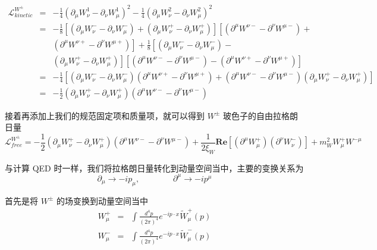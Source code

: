 \documentclass{article}
\begin{document}
\begin{eqnarray}
    \mathcal{L}_{kinetic}^{W^{\pm}} &=& -\frac{1}{4}\left(\partial_\mu W_\nu^1 - \partial_\nu W_\mu^1\right)^2 -\frac{1}{4}\left(\partial_\mu W_\nu^2 - \partial_\nu W_\mu^2\right)^2 \nonumber\\
    &=& -\frac{1}{8} \left[\left(\partial_\mu W_\nu^- - \partial_\nu W_\mu^-\right) + \left(\partial_\mu W_\nu^+ - \partial_\nu W_\mu^+\right)\right] \left[\left(\partial^\mu W^{\nu-} - \partial^\nu W^{\mu-}\right) + \right. \nonumber\\
    && \left.\left(\partial^\mu W^{\nu+} - \partial^\nu W^{\mu+}\right)\right] +\frac{1}{8} \left[\left(\partial_\mu W_\nu^- - \partial_\nu W_\mu^-\right) - \right. \nonumber\\
    && \left.\left(\partial_\mu W_\nu^+ - \partial_\nu W_\mu^+\right)\right] \left[\left(\partial^\mu W^{\nu-} - \partial^\nu W^{\mu-}\right) - \left(\partial^\mu W^{\nu+} - \partial^\nu W^{\mu+}\right)\right] \nonumber\\
    &=& -\frac{1}{4}\left[\left(\partial_\mu W_\nu^- - \partial_\nu W_\mu^-\right)\left(\partial^\mu W^{\nu+} - \partial^\nu W^{\mu+}\right) + \left(\partial^\mu W^{\nu-} - \partial^\nu W^{\mu-}\right)\left(\partial_\mu W_\nu^+ - \partial_\nu W_\mu^+\right)\right] \nonumber \\
    &=& -\frac{1}{2} \left(\partial_\mu W_\nu^+ - \partial_\nu W_\mu^+\right)\left(\partial^\mu W^{\nu-} - \partial^\nu W^{\mu-}\right) \nonumber
\end{eqnarray}

接着再添加上我们的规范固定项和质量项，就可以得到 $W^{\pm}$ 玻色子的自由拉格朗日量
\begin{equation}
    \mathcal{L}_{free}^{W^{\pm}} = -\frac{1}{2} \left(\partial_\mu W_\nu^+ - \partial_\nu W_\mu^+\right)\left(\partial^\mu W^{\nu-} - \partial^\nu W^{\mu-}\right) + \frac{1}{2\xi_W} \mathbf{Re}\left[\left(\partial^\mu W_\mu^{+}\right)\left(\partial^\nu W_{\nu}^{-}\right)\right] + m_W^2 W_{\mu}^+ W^{-\mu}
\end{equation}

与计算 QED 时一样，我们将拉格朗日量转化到动量空间当中，主要的变换关系为
\begin{equation}
    \partial_\mu \to -ip_\mu,\qquad\qquad \partial^\mu \to -ip^\mu
\end{equation}

首先是将 $W^{\pm}$ 的场变换到动量空间当中
\begin{eqnarray*}
    W_\mu^+ &=& \int \frac{d^4p}{(2\pi)^4} e^{-ip\cdot x} \tilde{W}_\mu^+(p) \\
    W_\mu^- &=& \int \frac{d^4p}{(2\pi)^4} e^{-ip\cdot x} \tilde{W}_\mu^-(p) 
\end{eqnarray*}
\end{document}
